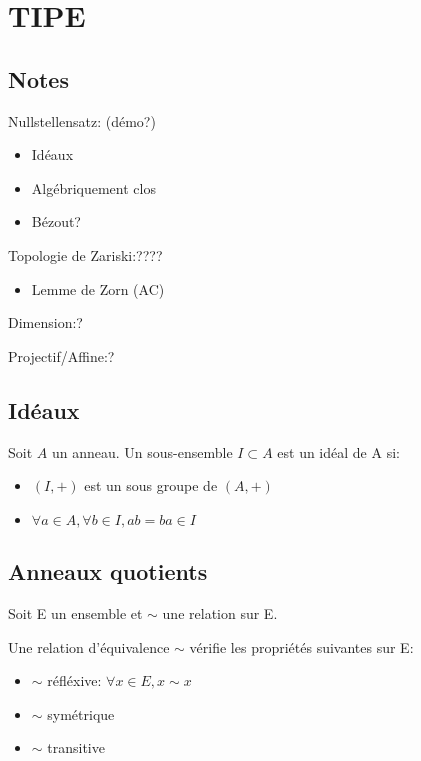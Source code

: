 \section{TIPE}

\subsection{Notes}

Nullstellensatz: (démo?)
\begin{itemize}
    \item Idéaux
    \item Algébriquement clos
    \item Bézout?
\end{itemize}
\mbox{}

Topologie de Zariski:????
\begin{itemize}
    \item Lemme de Zorn (AC)
\end{itemize}
\mbox{}

Dimension:?
\mbox{}

Projectif/Affine:?
\mbox{}


\subsection{Idéaux}

\begin{definition}
    Soit $A$ un anneau. Un sous-ensemble $I \subset A$ est un idéal de A si:
    \begin{itemize}
        \item $(I, +)$ est un sous groupe de $(A, +)$
        \item $\forall a \in A, \forall b \in I, ab = ba \in I$
    \end{itemize}
\end{definition}


\subsection{Anneaux quotients}

Soit E un ensemble et $\sim$ une relation sur E.

\begin{definition}
    Une relation d'équivalence $\sim$ vérifie les propriétés suivantes sur E:
    \begin{itemize}
        \item $\sim$ réfléxive: $\forall x \in E, x \sim x$
        \item $\sim$ symétrique
        \item $\sim$ transitive
    \end{itemize}
\end{definition}

